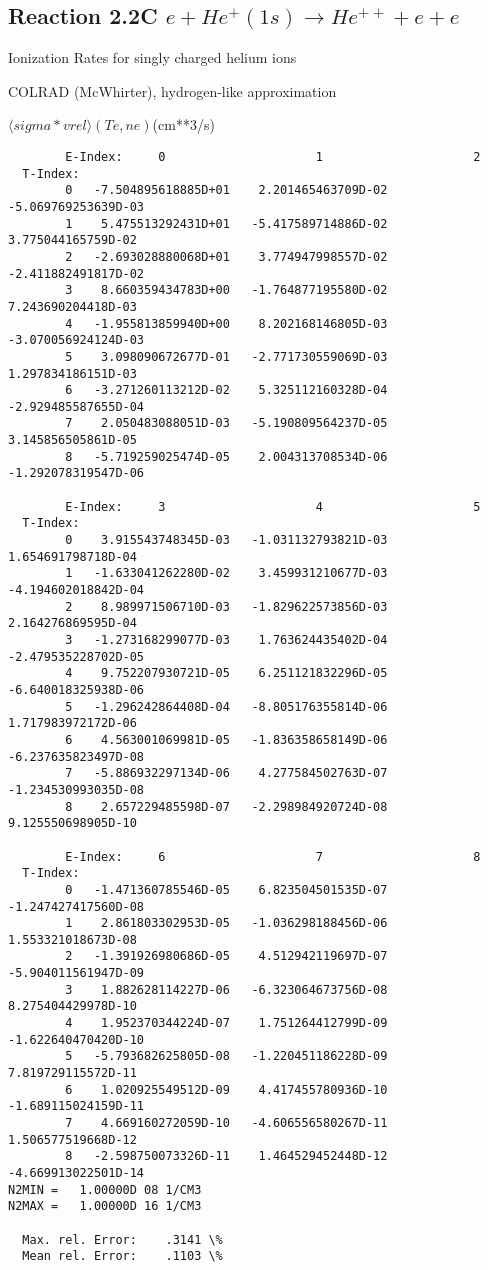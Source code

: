 \documentclass[12pt,dvipdfmx]{article}
\begin{document}
\subsection{
Reaction 2.2C $e + He^+(1s) \rightarrow He^{++}  + e  + e $
}
  Ionization Rates for singly charged helium ions

  COLRAD (McWhirter), hydrogen-like approximation \cite{kn:McWhirter}

$  \langle sigma*vrel \rangle(Te,ne) $(cm**3/s)

\begin{small}\begin{verbatim}
        E-Index:     0                     1                     2
  T-Index:
        0   -7.504895618885D+01    2.201465463709D-02   -5.069769253639D-03
        1    5.475513292431D+01   -5.417589714886D-02    3.775044165759D-02
        2   -2.693028880068D+01    3.774947998557D-02   -2.411882491817D-02
        3    8.660359434783D+00   -1.764877195580D-02    7.243690204418D-03
        4   -1.955813859940D+00    8.202168146805D-03   -3.070056924124D-03
        5    3.098090672677D-01   -2.771730559069D-03    1.297834186151D-03
        6   -3.271260113212D-02    5.325112160328D-04   -2.929485587655D-04
        7    2.050483088051D-03   -5.190809564237D-05    3.145856505861D-05
        8   -5.719259025474D-05    2.004313708534D-06   -1.292078319547D-06

        E-Index:     3                     4                     5
  T-Index:
        0    3.915543748345D-03   -1.031132793821D-03    1.654691798718D-04
        1   -1.633041262280D-02    3.459931210677D-03   -4.194602018842D-04
        2    8.989971506710D-03   -1.829622573856D-03    2.164276869595D-04
        3   -1.273168299077D-03    1.763624435402D-04   -2.479535228702D-05
        4    9.752207930721D-05    6.251121832296D-05   -6.640018325938D-06
        5   -1.296242864408D-04   -8.805176355814D-06    1.717983972172D-06
        6    4.563001069981D-05   -1.836358658149D-06   -6.237635823497D-08
        7   -5.886932297134D-06    4.277584502763D-07   -1.234530993035D-08
        8    2.657229485598D-07   -2.298984920724D-08    9.125550698905D-10

        E-Index:     6                     7                     8
  T-Index:
        0   -1.471360785546D-05    6.823504501535D-07   -1.247427417560D-08
        1    2.861803302953D-05   -1.036298188456D-06    1.553321018673D-08
        2   -1.391926980686D-05    4.512942119697D-07   -5.904011561947D-09
        3    1.882628114227D-06   -6.323064673756D-08    8.275404429978D-10
        4    1.952370344224D-07    1.751264412799D-09   -1.622640470420D-10
        5   -5.793682625805D-08   -1.220451186228D-09    7.819729115572D-11
        6    1.020925549512D-09    4.417455780936D-10   -1.689115024159D-11
        7    4.669160272059D-10   -4.606556580267D-11    1.506577519668D-12
        8   -2.598750073326D-11    1.464529452448D-12   -4.669913022501D-14
N2MIN =   1.00000D 08 1/CM3
N2MAX =   1.00000D 16 1/CM3

  Max. rel. Error:    .3141 \%
  Mean rel. Error:    .1103 \%

\end{verbatim}\end{small}
\end{document}
